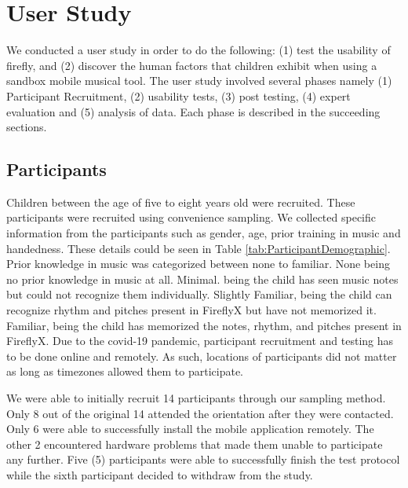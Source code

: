 \chapter{User Study}

We conducted a user study in order to do the following: (1) test the usability of firefly, and (2) discover the human factors that children exhibit when using a sandbox mobile musical tool. The user study involved several phases namely (1) Participant Recruitment, (2) usability tests, (3) post testing, (4) expert evaluation and (5) analysis of data. Each phase is described in the succeeding sections. 

\section{Participants}
Children between the age of five to eight years old were recruited. These participants were recruited using  convenience sampling. We collected specific information from the participants such as gender, age, prior training in music and handedness. These details could be seen in Table \ref{tab:ParticipantDemographic}. Prior knowledge in music was categorized between none to familiar. None being no prior knowledge in music at all. Minimal. being the child has seen music notes but could not recognize them individually. Slightly Familiar, being the child can recognize rhythm and pitches present in FireflyX but have not memorized it. Familiar, being the child has memorized the notes, rhythm, and pitches present in FireflyX. Due to the covid-19 pandemic, participant recruitment and testing has to be done online and remotely. As such, locations of participants did not matter as long as timezones allowed them to participate. 

We were able to initially recruit 14 participants through our sampling method. Only 8 out of the original 14 attended the orientation after they were contacted. Only 6 were able to successfully install the mobile application remotely. The other 2 encountered hardware problems that made them unable to participate any further. Five (5) participants were able to successfully finish the test protocol while the sixth participant decided to withdraw from the study. 


